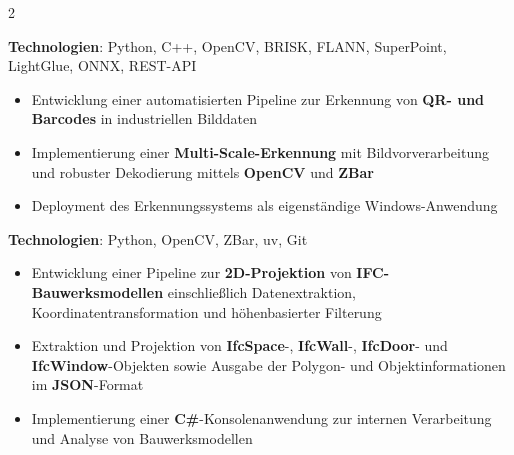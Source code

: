 \documentclass[10pt,a4paper,withhyper]{../altacv}
\begin{document}
\begin{paracol}{2}
  \vspace{0.5em}

  \textbf{Technologien}: Python, C++, OpenCV, BRISK, FLANN, SuperPoint, LightGlue, ONNX, REST-API

  \vspace{0.5em}

  \newpage
  

  \vspace{0.5em}

  \begin{itemize}
    \item Entwicklung einer automatisierten Pipeline zur Erkennung von \textbf{QR- und Barcodes} in industriellen Bilddaten
    \item Implementierung einer \textbf{Multi-Scale-Erkennung} mit Bildvorverarbeitung und robuster Dekodierung mittels \textbf{OpenCV} und \textbf{ZBar}
    \item Deployment des Erkennungssystems als eigenständige Windows-Anwendung
  \end{itemize}

  \vspace{0.5em}

  \textbf{Technologien}: Python, OpenCV, ZBar, uv, Git

  \vspace{0.5em}
  

  \vspace{0.5em}

  \begin{itemize}
    \item Entwicklung einer Pipeline zur \textbf{2D-Projektion} von \textbf{IFC-Bauwerksmodellen} einschließlich Datenextraktion, Koordinatentransformation und höhenbasierter Filterung
    \item Extraktion und Projektion von \textbf{IfcSpace}-, \textbf{IfcWall}-, \textbf{IfcDoor}- und \textbf{IfcWindow}-Objekten sowie Ausgabe der Polygon- und Objektinformationen im \textbf{JSON}-Format
    \item Implementierung einer \textbf{C\#}-Konsolenanwendung zur internen Verarbeitung und Analyse von Bauwerksmodellen
  \end{itemize}

  \vspace{0.5em}


\end{paracol}
\end{document}

